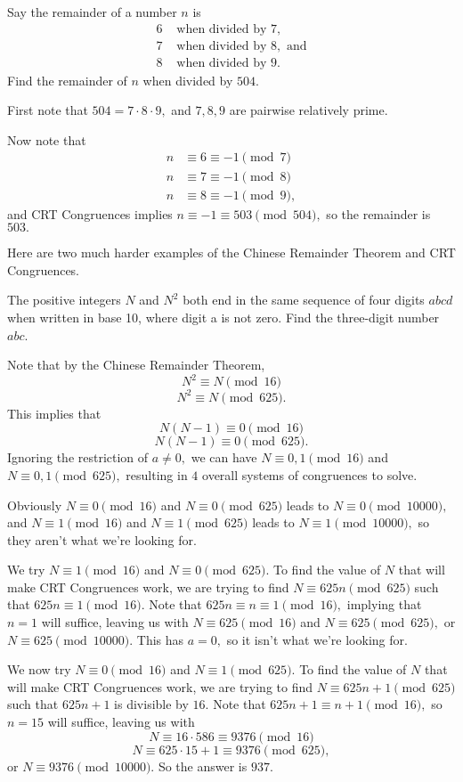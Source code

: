 \documentclass[blue,onecol]{shooting}
\begin{document}
\begin{exam}
Say the remainder of a number $n$ is
\begin{align*}
6 &\text{ when divided by } 7, \\
7 &\text{ when divided by } 8, \text{ and}\\
8 &\text{ when divided by } 9.
\end{align*}
Find the remainder of $n$ when divided by $504.$
\end{exam}

\begin{sol}
First note that $504=7\cdot 8\cdot 9,$ and $7,8,9$ are pairwise relatively prime.

Now note that
\begin{align*}
n&\equiv 6\equiv -1\pmod{7} \\
n&\equiv 7\equiv -1\pmod{8} \\
n&\equiv 8\equiv -1\pmod{9},
\end{align*}
and CRT Congruences implies $n\equiv -1\equiv 503\pmod{504},$ so the remainder is $503.$
\end{sol}

Here are two much harder examples of the Chinese Remainder Theorem and CRT Congruences.

\begin{exam}[AIME I 2014/8]
The positive integers $N$ and $N^2$ both end in the same sequence of four digits $abcd$ when written in base 10, where digit a is not zero. Find the three-digit number $abc$.
\end{exam}

\begin{sol}
Note that by the Chinese Remainder Theorem,
\[N^2\equiv N\pmod {16}\]
\[N^2\equiv N\pmod{625}.\]
This implies that
\[N(N-1)\equiv 0\pmod{16}\]
\[N(N-1)\equiv 0\pmod{625}.\]
Ignoring the restriction of $a\neq 0,$ we can have $N\equiv 0,1\pmod{16}$ and $N\equiv 0,1\pmod{625},$ resulting in $4$ overall systems of congruences to solve.

Obviously $N\equiv 0\pmod{16}$ and $N\equiv 0\pmod{625}$ leads to $N\equiv 0\pmod{10000},$ and $N\equiv 1\pmod{16}$ and $N\equiv 1\pmod{625}$ leads to $N\equiv 1\pmod{10000},$ so they aren't what we're looking for.

We try $N\equiv 1\pmod{16}$ and $N\equiv 0\pmod{625}.$ To find the value of $N$ that will make CRT Congruences work, we are trying to find $N\equiv 625n\pmod{625}$ such that $625n\equiv 1\pmod{16}.$ Note that $625n\equiv n\equiv 1\pmod{16},$ implying that $n=1$ will suffice, leaving us with $N\equiv 625\pmod{16}$ and $N\equiv 625\pmod{625},$ or $N\equiv 625\pmod{10000}.$ This has $a=0,$ so it isn't what we're looking for.

We now try $N\equiv 0\pmod{16}$ and $N\equiv 1\pmod{625}.$ To find the value of $N$ that will make CRT Congruences work, we are trying to find $N\equiv 625n+1\pmod{625}$ such that $625n+1$ is divisible by $16.$ Note that $625n+1\equiv n+1\pmod{16},$ so $n=15$ will suffice, leaving us with
\[N\equiv 16\cdot 586\equiv 9376\pmod{16}\]
\[N\equiv 625\cdot 15+1\equiv 9376\pmod{625},\]
or $N\equiv 9376\pmod{10000}.$ So the answer is $937.$
\end{sol}
\end{document}
